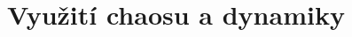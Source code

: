 \documentclass[thesis=B, czech]{FITthesis}[2019/03/06]
\begin{document}





\section{Využití chaosu a dynamiky}



\end{document}
